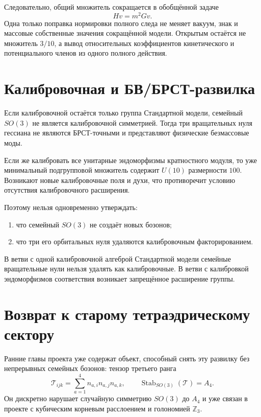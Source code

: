 Следовательно, общий множитель сокращается в обобщённой задаче
\begin{equation}
 H v=m^2Gv.
\end{equation}
Одна только поправка нормировки полного следа не меняет вакуум, знак и
массовые собственные значения сокращённой модели. Открытым остаётся не
множитель $3/10$, а вывод относительных коэффициентов кинетического и
потенциального членов из одного полного действия.

\section{Калибровочная и БВ/БРСТ-развилка}

Если калибровочной остаётся только группа Стандартной модели, семейный
$SO(3)$ не является калибровочной симметрией. Тогда три вращательных нуля
гессиана не являются БРСТ-точными и представляют физические безмассовые
моды.

Если же калибровать все унитарные эндоморфизмы кратностного модуля, то уже
минимальный подгрупповой множитель содержит $U(10)$ размерности $100$.
Возникают новые калибровочные поля и духи, что противоречит условию
отсутствия калибровочного расширения.

Поэтому нельзя одновременно утверждать:
\begin{enumerate}
 \item что семейный $SO(3)$ не создаёт новых бозонов;
 \item что три его орбитальных нуля удаляются калибровочным
 факторированием.
\end{enumerate}

\begin{nogocriterion}
В ветви с одной калибровочной алгеброй Стандартной модели семейные
вращательные нули нельзя удалять как калибровочные. В ветви с калибровкой
эндоморфизмов соответствия возникает запрещённое расширение группы.
\end{nogocriterion}

\section{Возврат к старому тетраэдрическому сектору}

Ранние главы проекта уже содержат объект, способный снять эту развилку без
непрерывных семейных бозонов: тензор третьего ранга
\begin{equation}
 \mathcal T_{ijk}=\sum_{a=1}^4n_{a,i}n_{a,j}n_{a,k},
 \qquad
 \operatorname{Stab}_{SO(3)}(\mathcal T)=A_4.
\end{equation}
Он дискретно нарушает случайную симметрию $SO(3)$ до $A_4$ и уже связан в
проекте с кубическим корневым расслоением и голономией $\mathbb Z_3$.

